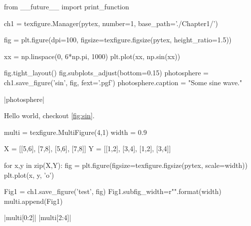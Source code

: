 \begin{pycode}[chapter1]
from __future__ import print_function

ch1 = texfigure.Manager(pytex, number=1, base_path='./Chapter1/')
\end{pycode}

\begin{pycode}[chapter1]
fig = plt.figure(dpi=100, figsize=texfigure.figsize(pytex, height_ratio=1.5))

xx = np.linspace(0, 6*np.pi, 1000)
plt.plot(xx, np.sin(xx))

fig.tight_layout()
fig.subplots_adjust(bottom=0.15)
photosphere = ch1.save_figure('sin', fig, fext='.pgf')
photosphere.caption = "Some sine wave."
\end{pycode}

\py[chapter1]|photosphere|



Hello world, checkout \cref{fig:sin}.


\begin{pycode}[chapter1]
	
multi = texfigure.MultiFigure(4,1)
width = 0.9

X = [[5,6], [7,8], [5,6], [7,8]]
Y = [[1,2], [3,4], [1,2], [3,4]]

for x,y in zip(X,Y):
	fig = plt.figure(figsize=texfigure.figsize(pytex, scale=width))
	plt.plot(x, y, 'o')
	
	Fig1 = ch1.save_figure('test', fig)
	Fig1.subfig_width=r"{}\columnwidth".format(width)
	multi.append(Fig1)
\end{pycode}

\py[chapter1]|multi[0:2]|
\py[chapter1]|multi[2:4]|
